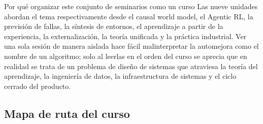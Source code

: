 \begin{knowledgebox}{Por qué organizar este conjunto de seminarios como un curso}
Las nueve unidades abordan el tema respectivamente desde el causal world model, el Agentic RL, la previsión de fallas, la síntesis de entornos, el aprendizaje a partir de la experiencia, la externalización, la teoría unificada y la práctica industrial. Ver una sola sesión de manera aislada hace fácil malinterpretar la automejora como el nombre de un algoritmo; solo al leerlas en el orden del curso se aprecia que en realidad se trata de un problema de diseño de sistemas que atraviesa la teoría del aprendizaje, la ingeniería de datos, la infraestructura de sistemas y el ciclo cerrado del producto.
\end{knowledgebox}

\subsection{Mapa de ruta del curso}

